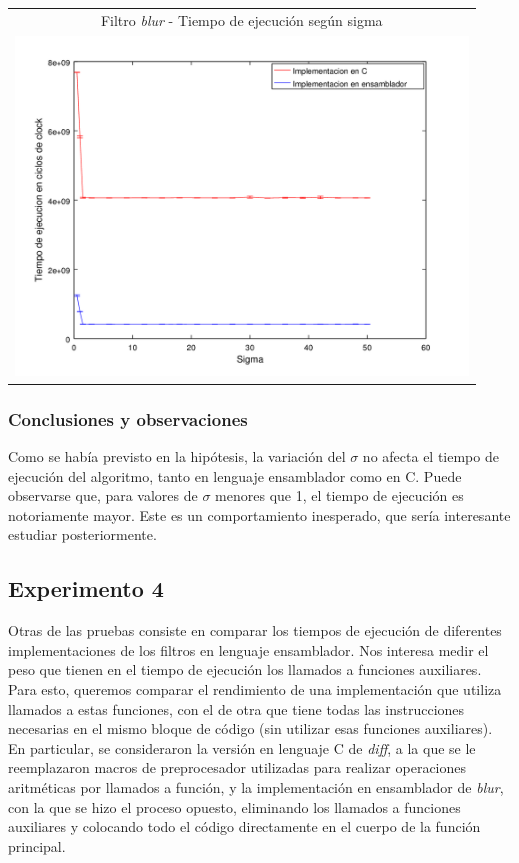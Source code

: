 			{\centering \begin{tabular}{c}
	      		{\small Filtro \emph{blur} - Tiempo de ejecución según sigma} \\
	      			\includegraphics[width=12cm]{../exp/graficos/exp3-tiempo_segun_sigma.png} \\
	    		\end{tabular}}

			\subsubsection*{Conclusiones y observaciones}
				Como se había previsto en la hipótesis, la variación del $\sigma$ no afecta el tiempo de ejecución del algoritmo, tanto en lenguaje ensamblador como en C. Puede observarse que, para valores de $\sigma$ menores que 1, el tiempo de ejecución es notoriamente mayor. Este es un comportamiento inesperado, que sería interesante estudiar posteriormente.

	\subsection{Experimento 4}
		Otras de las pruebas consiste en comparar los tiempos de ejecución de diferentes implementaciones de los filtros en lenguaje ensamblador. Nos interesa medir el peso que tienen en el tiempo de ejecución los llamados a funciones auxiliares. Para esto, queremos comparar el rendimiento de una implementación que utiliza llamados a estas funciones, con el de otra que tiene todas las instrucciones necesarias en el mismo bloque de código (sin utilizar esas funciones auxiliares).
		En particular, se consideraron la versión en lenguaje C de \emph{diff}, a la que se le reemplazaron macros de preprocesador utilizadas para realizar operaciones aritméticas por llamados a función, y la implementación en ensamblador de \emph{blur}, con la que se hizo el proceso opuesto, eliminando los llamados a funciones auxiliares y colocando todo el código directamente en el cuerpo de la función principal.
		
